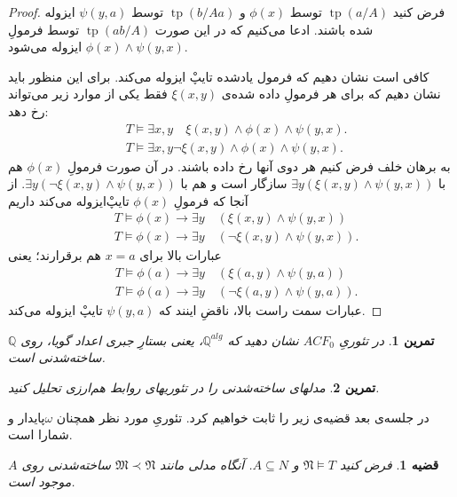 \documentclass[12pt,a4paper]{report}
\theoremstyle{colorhead}
\newtheorem{thm}{قضیه}
\newtheorem{tam}{تمرین}
\DeclareMathOperator{\tp}{tp}
\begin{document}
	\begin{proof}
	فرض کنید
$\tp(a/A)$
توسط
$\phi(x)$
و 
$\tp(b/Aa)$
توسط
$\psi(y,a)$
ایزوله شده باشند. ادعا می‌کنیم که در این صورت
$\tp(ab/A)$
توسط فرمولِ
$\phi(x)\wedge\psi(y,x)$
ایزوله می‌شود.
\par
کافی است نشان دهیم که فرمول یادشده تایپْ ایزوله می‌کند. برای این منظور باید نشان دهیم که برای هر فرمولِ داده شده‌ی
$\xi(x,y)$
فقط یکی از موارد زیر می‌تواند رخ دهد:
\begin{align*}
& T\models \exists x,y \quad \xi(x,y)\wedge \phi(x)\wedge\psi(y,x).
\\
& T \models \exists x,y \neg \xi(x,y)\wedge \phi(x)\wedge \psi(y,x).
\end{align*}
	به برهان خلف فرض کنیم هر دوی آنها رخ داده باشند. در آن صورت فرمولِ
	$\phi(x)$
	هم با
	$\exists y(\xi(x,y)\wedge \psi(y,x))$
	سازگار است و هم با
	$\exists y(\neg \xi(x,y)\wedge \psi(y,x))$.
	از آنجا که فرمولِ
	$\phi(x)$
	تایپْ‌ایزوله می‌کند داریم
	\begin{align*}
	& T\models \phi(x)\to \exists y\quad
(\xi(x,y)\wedge \psi(y,x))\\
	& T\models \phi(x)\to  
	\exists y\quad (\neg \xi(x,y)\wedge \psi(y,x)).
	\end{align*}
	عبارات بالا برای 
	$x=a$
	هم برقرارند؛ یعنی
		\begin{align*}
	& T\models \phi(a)\to \exists y\quad
(\xi(a,y)\wedge \psi(y,a))\\
	& T\models \phi(a)\to  
	\exists y\quad (\neg \xi(a,y)\wedge \psi(y,a)).
	\end{align*}
	عبارات سمت راست بالا، ناقضِ‌ اینند که
	$\psi(y,a)$
	تایپْ ایزوله می‌کند.
	\end{proof}
\begin{tam}
در تئوریِ
$ACF_0$
نشان دهید که 
$\mathbb{Q}^{alg}$، 
یعنی بستارِ جبری اعداد گویا، روی
$\mathbb{Q}$
ساخته‌شدنی است.
\end{tam}
\begin{tam}
مدلهای ساخته‌شدنی را در تئوریهای روابط هم‌ارزی تحلیل کنید. 
\end{tam}
در جلسه‌ی بعد قضیه‌ی زیر را ثابت خواهیم کرد.
تئوریِ مورد نظر همچنان
$\omega$پایدار
و شمارا است. 
\begin{thm}
فرض کنید
$ \mathfrak{N}\models T$
و
$A\subseteq N$.
آنگاه 
مدلی مانند
$\mathfrak{M}\prec \mathfrak{N}$
ساخته‌شدنی روی
$A$
موجود است. 
\end{thm}
\pagebreak 
\end{document}
